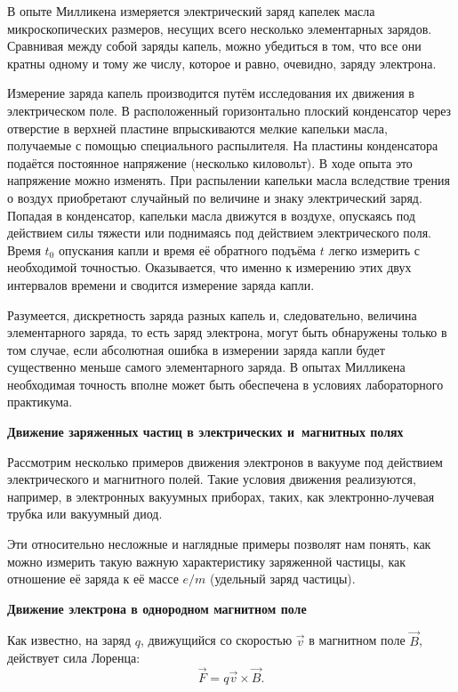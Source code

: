 В опыте Милликена измеряется электрический заряд капелек масла микроскопических размеров, несущих всего несколько
элементарных зарядов. Сравнивая между собой заряды капель, можно убедиться в том, что все они кратны одному и тому же числу, которое и равно, очевидно, заряду электрона.


Измерение заряда капель производится путём исследования их движения в электрическом поле. В расположенный горизонтально плоский конденсатор через отверстие в верхней пластине впрыскиваются мелкие капельки масла, получаемые с помощью специального распылителя. На пластины конденсатора подаётся постоянное напряжение (несколько киловольт). В ходе опыта это напряжение можно изменять. При распылении капельки масла вследствие трения о воздух приобретают случайный по величине и знаку электрический заряд. Попадая в конденсатор, капельки масла движутся в воздухе, опускаясь под действием силы тяжести или поднимаясь под действием электрического поля. Время $t_0$ опускания капли и время её обратного подъёма $t$ легко измерить с необходимой точностью. Оказывается, что именно к измерению этих двух интервалов времени и сводится измерение заряда капли.

Разумеется, дискретность заряда разных капель и, следовательно, величина элементарного заряда, то есть заряд электрона, могут быть обнаружены только в том случае, если абсолютная ошибка в измерении заряда капли будет существенно меньше самого элементарного заряда. В опытах Милликена необходимая точность вполне может быть обеспечена в условиях лабораторного практикума.

{\bf \Large Движение заряженных частиц в электрических и~магнитных полях}

Рассмотрим несколько примеров движения электронов в вакууме под действием электрического и магнитного полей. Такие
условия движения реализуются, например, в электронных вакуумных приборах, таких, как электронно-лучевая трубка или
вакуумный диод.

Эти относительно несложные и наглядные примеры позволят нам понять, как можно измерить такую важную характеристику
заряженной частицы, как отношение её заряда к её массе $e/m$ (удельный заряд частицы).

{\bf \large   Движение электрона в однородном магнитном поле}


Как известно, на заряд $q$, движущийся со скоростью $\vec{v}$ в магнитном поле $\vec{B}$, действует сила Лоренца:
$$
\vec{F}=q{\vec{v}}\times{\vec{B}}.
$$

